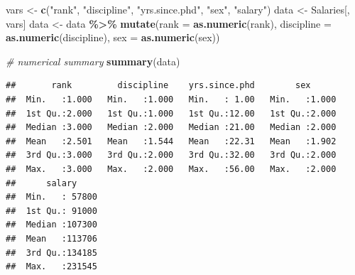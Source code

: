 \documentclass[
]{article}
\newenvironment{Shaded}{\begin{snugshade}}{\end{snugshade}}
\newcommand{\AttributeTok}[1]{\textcolor[rgb]{0.13,0.29,0.53}{#1}}
\newcommand{\CommentTok}[1]{\textcolor[rgb]{0.56,0.35,0.01}{\textit{#1}}}
\newcommand{\FunctionTok}[1]{\textcolor[rgb]{0.13,0.29,0.53}{\textbf{#1}}}
\newcommand{\NormalTok}[1]{#1}
\newcommand{\OtherTok}[1]{\textcolor[rgb]{0.56,0.35,0.01}{#1}}
\newcommand{\SpecialCharTok}[1]{\textcolor[rgb]{0.81,0.36,0.00}{\textbf{#1}}}
\newcommand{\StringTok}[1]{\textcolor[rgb]{0.31,0.60,0.02}{#1}}
\begin{document}
\begin{Shaded}
\begin{Highlighting}[]
\NormalTok{vars }\OtherTok{\textless{}{-}} \FunctionTok{c}\NormalTok{(}\StringTok{"rank"}\NormalTok{, }\StringTok{"discipline"}\NormalTok{, }\StringTok{"yrs.since.phd"}\NormalTok{, }\StringTok{"sex"}\NormalTok{, }\StringTok{"salary"}\NormalTok{)}
\NormalTok{data }\OtherTok{\textless{}{-}}\NormalTok{ Salaries[, vars]}
\NormalTok{data }\OtherTok{\textless{}{-}}\NormalTok{ data }\SpecialCharTok{\%\textgreater{}\%}
  \FunctionTok{mutate}\NormalTok{(}\AttributeTok{rank =} \FunctionTok{as.numeric}\NormalTok{(rank),}
         \AttributeTok{discipline =} \FunctionTok{as.numeric}\NormalTok{(discipline),}
         \AttributeTok{sex =} \FunctionTok{as.numeric}\NormalTok{(sex))}

\CommentTok{\# numerical summary}
\FunctionTok{summary}\NormalTok{(data)}
\end{Highlighting}
\end{Shaded}

\begin{verbatim}
##       rank         discipline    yrs.since.phd        sex       
##  Min.   :1.000   Min.   :1.000   Min.   : 1.00   Min.   :1.000  
##  1st Qu.:2.000   1st Qu.:1.000   1st Qu.:12.00   1st Qu.:2.000  
##  Median :3.000   Median :2.000   Median :21.00   Median :2.000  
##  Mean   :2.501   Mean   :1.544   Mean   :22.31   Mean   :1.902  
##  3rd Qu.:3.000   3rd Qu.:2.000   3rd Qu.:32.00   3rd Qu.:2.000  
##  Max.   :3.000   Max.   :2.000   Max.   :56.00   Max.   :2.000  
##      salary      
##  Min.   : 57800  
##  1st Qu.: 91000  
##  Median :107300  
##  Mean   :113706  
##  3rd Qu.:134185  
##  Max.   :231545
\end{verbatim}

\begin{Shaded}
\end{Shaded}
\end{document}
